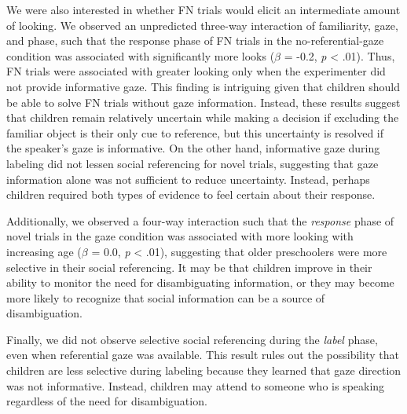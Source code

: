 \documentclass[english,man]{apa6}
\theoremstyle{definition}
\theoremstyle{definition}
\theoremstyle{definition}
\theoremstyle{remark}
\begin{document}
We were also interested in whether FN trials would elicit an
intermediate amount of looking. We observed an unpredicted three-way
interaction of familiarity, gaze, and phase, such that the response
phase of FN trials in the no-referential-gaze condition was associated
with significantly more looks (\(\beta\) = -0.2, \emph{p} \textless{}
.01). Thus, FN trials were associated with greater looking only when the
experimenter did not provide informative gaze. This finding is
intriguing given that children should be able to solve FN trials without
gaze information. Instead, these results suggest that children remain
relatively uncertain while making a decision if excluding the familiar
object is their only cue to reference, but this uncertainty is resolved
if the speaker's gaze is informative. On the other hand, informative
gaze during labeling did not lessen social referencing for novel trials,
suggesting that gaze information alone was not sufficient to reduce
uncertainty. Instead, perhaps children required both types of evidence
to feel certain about their response.

Additionally, we observed a four-way interaction such that the
\emph{response} phase of novel trials in the gaze condition was
associated with more looking with increasing age (\(\beta\) = 0.0,
\emph{p} \textless{} .01), suggesting that older preschoolers were more
selective in their social referencing. It may be that children improve
in their ability to monitor the need for disambiguating information, or
they may become more likely to recognize that social information can be
a source of disambiguation.

Finally, we did not observe selective social referencing during the
\emph{label} phase, even when referential gaze was available. This
result rules out the possibility that children are less selective during
labeling because they learned that gaze direction was not informative.
Instead, children may attend to someone who is speaking regardless of
the need for disambiguation.
\end{document}
